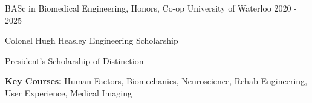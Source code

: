 \documentclass[11pt, a4paper]{russell}
\begin{document}
\makecvheader

\begin{cventries}
    \cventry
        {BASc in Biomedical Engineering, Honors, Co-op} %
        {University of Waterloo} %
        {} %
        {2020 - 2025} %
        {
          \begin{cvitems}
            \item {Colonel Hugh Heasley Engineering Scholarship}
            \item {President's Scholarship of Distinction}
            \item {\textbf{Key Courses:} Human Factors, Biomechanics, Neuroscience, Rehab Engineering, User Experience, Medical Imaging}
          \end{cvitems}
        }
\end{cventries}
\end{document}
